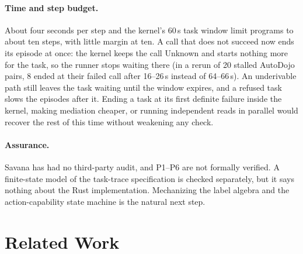 \documentclass[letterpaper,twocolumn,10pt]{article}
\newcommand{\sys}{Savana}
\begin{document}
\paragraph{Time and step budget.} About four seconds per step and the
kernel's 60\,s task window limit programs to about ten steps, with little
margin at ten. A call that does not succeed now ends its episode at once:
the kernel keeps the call Unknown and starts nothing more for the task, so
the runner stops waiting there (in a rerun of 20 stalled AutoDojo pairs, 8
ended at their failed call after 16--26\,s instead of 64--66\,s). An
underivable path still leaves the task waiting until the window expires,
and a refused task slows the episodes after it. Ending a task at its first
definite failure inside the kernel, making mediation cheaper, or running
independent reads in parallel would recover the rest of this time without
weakening any check.

\paragraph{Assurance.} \sys{} has had no third-party audit, and P1--P6
are not formally verified. A finite-state model of the task-trace
specification is checked separately, but it says nothing about the Rust
implementation. Mechanizing the label algebra and the action-capability
state machine is the natural next step.

\section{Related Work}
\label{sec:related}
\end{document}

